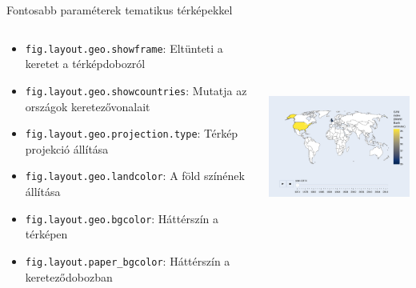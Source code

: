 \documentclass[english, aspectratio=169]{beamer}
\begin{document}
\begin{frame}{Fontosabb paraméterek tematikus térképekkel}
	\begin{columns}
		\begin{column}{.5\textwidth}
			\begin{itemize}
				\item \texttt{fig.layout.geo.showframe}: Eltünteti a keretet a térképdobozról
				\item \texttt{fig.layout.geo.showcountries}: Mutatja az országok keretezővonalait
				\item \texttt{fig.layout.geo.projection.type}: Térkép projekció állítása
				\item \texttt{fig.layout.geo.landcolor}: A föld színének állítása
				\item \texttt{fig.layout.geo.bgcolor}: Háttérszín a térképen
				\item \texttt{fig.layout.paper\_bgcolor}: Háttérszín a kereteződobozban
			\end{itemize}
		\end{column}
		\begin{column}{.5\textwidth}
			\begin{center}
				\includegraphics[width=7cm, height=7cm, keepaspectratio]{images/scatter_22.png}
			\end{center}
		\end{column}
	\end{columns}
\end{frame}
\end{document}
